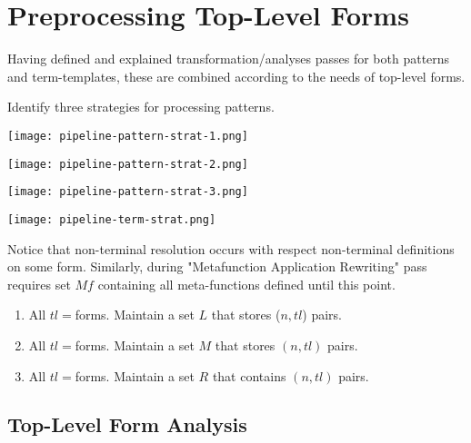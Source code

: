 \section{Preprocessing Top-Level Forms}

Having defined and explained transformation/analyses passes for both patterns and term-templates, these are combined according to the needs of top-level forms. 

Identify three strategies for processing patterns.

\texttt{[image: pipeline-pattern-strat-1.png]}

\texttt{[image: pipeline-pattern-strat-2.png]}

\texttt{[image: pipeline-pattern-strat-3.png]}

\texttt{[image: pipeline-term-strat.png]}

Notice that non-terminal resolution occurs with respect non-terminal definitions on some \DefineLanguageNoArg form. Similarly, during "Metafunction Application Rewriting" pass requires set $Mf$ containing all meta-functions defined until this point. 

\begin{enumerate}
\item All $tl=$\TlDefineLanguage \space forms. Maintain a set $L$ that stores ($n, tl$) pairs.
\item All $tl=$\TlDefineMetafunction \space forms. Maintain a set $M$ that stores $(n, tl)$ pairs.
\item All $tl=$\TlDefineReductionRelation \space forms. Maintain a set $R$ that contains $(n, tl)$ pairs.
\end{enumerate}

\subsection{Top-Level Form Analysis}

